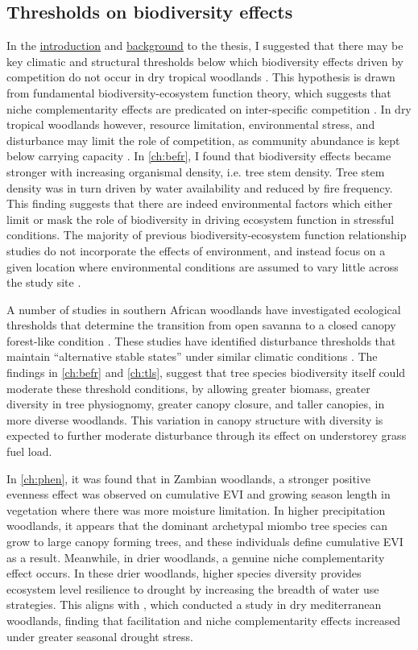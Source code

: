 \begin{refsection}
\subsection{Thresholds on biodiversity effects}
\label{discussion:ssec:thresholds}

In the \hyperref[ch:intro]{introduction} and \hyperref[ch:background]{background} to the thesis, I suggested that there may be key climatic and structural thresholds below which biodiversity effects driven by competition do not occur in dry tropical woodlands \citep{}. This hypothesis is drawn from fundamental biodiversity-ecosystem function theory, which suggests that niche complementarity effects are predicated on inter-specific competition \citep{}. In dry tropical woodlands however, resource limitation, environmental stress, and disturbance may limit the role of competition, as community abundance is kept below carrying capacity \citep{}. In \autoref{ch:befr}, I found that biodiversity effects became stronger with increasing organismal density, i.e. tree stem density. Tree stem density was in turn driven by water availability and reduced by fire frequency. This finding suggests that there are indeed environmental factors which either limit or mask the role of biodiversity in driving ecosystem function in stressful conditions. The majority of previous biodiversity-ecosystem function relationship studies do not incorporate the effects of environment, and instead focus on a given location where environmental conditions are assumed to vary little across the study site \citep{}. 

A number of studies in southern African woodlands have investigated ecological thresholds that determine the transition from open savanna to a closed canopy forest-like condition \citep{}. These studies have identified disturbance thresholds that maintain ``alternative stable states'' under similar climatic conditions \citep{}. The findings in \autoref{ch:befr} and \autoref{ch:tls}, suggest that tree species biodiversity itself could moderate these threshold conditions, by allowing greater biomass, greater diversity in tree physiognomy, greater canopy closure, and taller canopies, in more diverse woodlands. This variation in canopy structure with diversity is expected to further moderate disturbance through its effect on understorey grass fuel load.

In \autoref{ch:phen}, it was found that in Zambian woodlands, a stronger positive evenness effect was observed on cumulative EVI and growing season length in vegetation where there was more moisture limitation. In higher precipitation woodlands, it appears that the dominant archetypal miombo tree species can grow to large canopy forming trees, and these individuals define cumulative EVI as a result. Meanwhile, in drier woodlands, a genuine niche complementarity effect occurs. In these drier woodlands, higher species diversity provides ecosystem level resilience to drought by increasing the breadth of water use strategies. This aligns with \citet{Ratcliffe2017}, which conducted a study in dry mediterranean woodlands, finding that facilitation and niche complementarity effects increased under greater seasonal drought stress.


\end{refsection}
